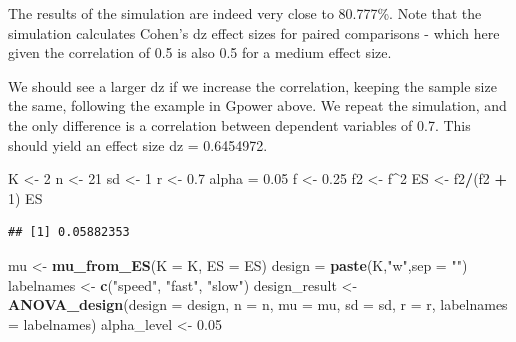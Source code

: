 \documentclass[
]{book}
\newenvironment{Shaded}{\begin{snugshade}}{\end{snugshade}}
\newcommand{\DataTypeTok}[1]{\textcolor[rgb]{0.13,0.29,0.53}{#1}}
\newcommand{\DecValTok}[1]{\textcolor[rgb]{0.00,0.00,0.81}{#1}}
\newcommand{\FloatTok}[1]{\textcolor[rgb]{0.00,0.00,0.81}{#1}}
\newcommand{\KeywordTok}[1]{\textcolor[rgb]{0.13,0.29,0.53}{\textbf{#1}}}
\newcommand{\NormalTok}[1]{#1}
\newcommand{\OperatorTok}[1]{\textcolor[rgb]{0.81,0.36,0.00}{\textbf{#1}}}
\newcommand{\StringTok}[1]{\textcolor[rgb]{0.31,0.60,0.02}{#1}}
\begin{document}
The results of the simulation are indeed very close to 80.777\%. Note that the simulation calculates Cohen's dz effect sizes for paired comparisons - which here given the correlation of 0.5 is also 0.5 for a medium effect size.

\newpage

We should see a larger dz if we increase the correlation, keeping the sample size the same, following the example in Gpower above. We repeat the simulation, and the only difference is a correlation between dependent variables of 0.7. This should yield an effect size dz = 0.6454972.

\begin{Shaded}
\begin{Highlighting}[]
\NormalTok{K <-}\StringTok{ }\DecValTok{2}
\NormalTok{n <-}\StringTok{ }\DecValTok{21}
\NormalTok{sd <-}\StringTok{ }\DecValTok{1}
\NormalTok{r <-}\StringTok{ }\FloatTok{0.7}
\NormalTok{alpha =}\StringTok{ }\FloatTok{0.05}
\NormalTok{f <-}\StringTok{ }\FloatTok{0.25}
\NormalTok{f2 <-}\StringTok{ }\NormalTok{f}\OperatorTok{^}\DecValTok{2}
\NormalTok{ES <-}\StringTok{ }\NormalTok{f2}\OperatorTok{/}\NormalTok{(f2 }\OperatorTok{+}\StringTok{ }\DecValTok{1}\NormalTok{)}
\NormalTok{ES}
\end{Highlighting}
\end{Shaded}

\begin{verbatim}
## [1] 0.05882353
\end{verbatim}

\begin{Shaded}
\begin{Highlighting}[]
\NormalTok{mu <-}\StringTok{ }\KeywordTok{mu_from_ES}\NormalTok{(}\DataTypeTok{K =}\NormalTok{ K, }\DataTypeTok{ES =}\NormalTok{ ES)}
\NormalTok{design =}\StringTok{ }\KeywordTok{paste}\NormalTok{(K,}\StringTok{"w"}\NormalTok{,}\DataTypeTok{sep =} \StringTok{""}\NormalTok{)}
\NormalTok{labelnames <-}\StringTok{ }\KeywordTok{c}\NormalTok{(}\StringTok{"speed"}\NormalTok{, }\StringTok{"fast"}\NormalTok{, }\StringTok{"slow"}\NormalTok{)}
\NormalTok{design_result <-}\StringTok{ }\KeywordTok{ANOVA_design}\NormalTok{(}\DataTypeTok{design =}\NormalTok{ design,}
                   \DataTypeTok{n =}\NormalTok{ n, }\DataTypeTok{mu =}\NormalTok{ mu, }\DataTypeTok{sd =}\NormalTok{ sd, }\DataTypeTok{r =}\NormalTok{ r, }
                   \DataTypeTok{labelnames =}\NormalTok{ labelnames)}
\NormalTok{alpha_level <-}\StringTok{ }\FloatTok{0.05}
\end{Highlighting}
\end{Shaded}
\end{document}
